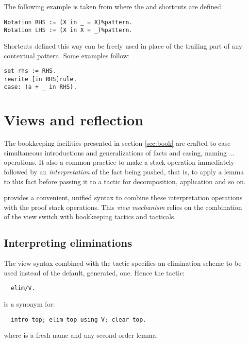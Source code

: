 The following example is taken from  where the
 and  shortcuts are defined.

\begin{lstlisting}
Notation RHS := (X in _ = X)%pattern.
Notation LHS := (X in X = _)%pattern.
\end{lstlisting}

Shortcuts defined this way can be freely used in place of the
trailing   {\term} part of any contextual
pattern.
Some examples follow:

\begin{lstlisting}
set rhs := RHS.
rewrite [in RHS]rule.
case: (a + _ in RHS).
\end{lstlisting}
\section{Views and reflection}\label{sec:views}

The bookkeeping facilities presented in section \ref{sec:book} are
crafted to ease simultaneous introductions and generalizations of facts and
casing,
naming $\dots$ operations. It also a common practice to make a stack
operation immediately followed by an \emph{interpretation} of the fact
being pushed,
that is, to apply a lemma to this fact before passing it
to a tactic for decomposition, application and so on.




\ssr{} provides a convenient, unified syntax to combine these
interpretation operations with the proof stack operations. This
\emph{view mechanism} relies on the combination of the \ssrC{/} view
switch with bookkeeping tactics and tacticals.

\subsection{Interpreting eliminations}

The view syntax combined with the  tactic specifies an
elimination scheme to
be used instead of the default, generated, one. Hence the \ssr{} tactic:
\begin{lstlisting}
  elim/V.
\end{lstlisting}
is a synonym for:
\begin{lstlisting}
  intro top; elim top using V; clear top.
\end{lstlisting}
where  is a fresh name and  any second-order lemma.

